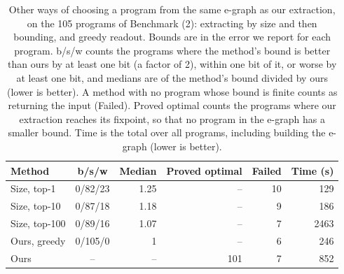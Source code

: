\begin{table}[H] \centering \small
\caption{Other ways of choosing a program from the same e-graph as our extraction, on the 105 programs of Benchmark (2): extracting by size and then bounding, and greedy readout. Bounds are in the error we report for each program. b/s/w counts the programs where the method's bound is better than ours by at least one bit (a factor of 2), within one bit of it, or worse by at least one bit, and medians are of the method's bound divided by ours (lower is better). A method with no program whose bound is finite counts as returning the input (Failed). Proved optimal counts the programs where our extraction reaches its fixpoint, so that no program in the e-graph has a smaller bound. Time is the total over all programs, including building the e-graph (lower is better).}\label{tab:extraction}
\begin{tabular}{lcrrrr}
\toprule
Method & b/s/w & Median & Proved optimal & Failed & Time (s) \\
\midrule
Size, top-1 & 0/82/23 & 1.25 & -- & 10 & 129 \\
Size, top-10 & 0/87/18 & 1.18 & -- & 9 & 186 \\
Size, top-100 & 0/89/16 & 1.07 & -- & 7 & 2463 \\
Ours, greedy & 0/105/0 & 1 & -- & 6 & 246 \\
Ours & -- & -- & 101 & 7 & 852 \\
\bottomrule
\end{tabular}
\end{table}
